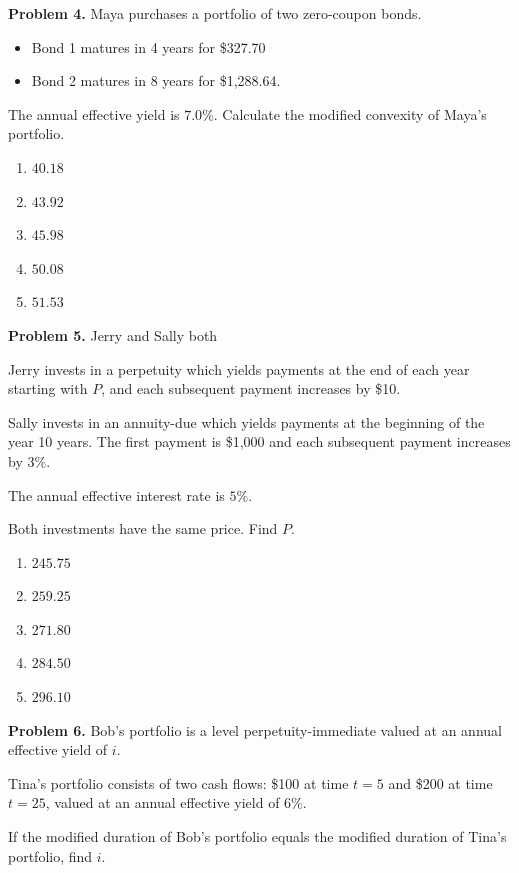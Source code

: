 \documentclass[12pt]{article}
\begin{document}
\textbf{Problem 4.} Maya purchases a portfolio of two zero-coupon bonds.

\begin{itemize}
    \item Bond 1 matures in 4 years for \$327.70
    \item Bond 2 matures in 8 years for \$1{,}288.64.
\end{itemize}

The annual effective yield is $7.0\%$. Calculate the modified convexity of Maya's portfolio.

\begin{enumerate}[label=\Alph*.]
    \item $40.18$
    \item $43.92$
    \item $45.98$
    \item $50.08$
    \item $51.53$
\end{enumerate}


\newpage


\textbf{Problem 5.} Jerry and Sally both 

Jerry invests in a perpetuity which yields payments at the end of each year starting with $P$, and each subsequent payment increases by \$10.

Sally invests in an annuity-due which yields payments at the beginning of the year 10 years. The first payment is \$1{,}000 and each subsequent payment increases by $3\%$.

The annual effective interest rate is $5\%$.

Both investments have the same price. Find $P$.

\begin{enumerate}[label=\Alph*.]
    \item $245.75$
    \item $259.25$
    \item $271.80$
    \item $284.50$
    \item $296.10$
\end{enumerate}


\newpage


\textbf{Problem 6.} Bob's portfolio is a level perpetuity-immediate valued at an annual effective yield of $i$.

 Tina's portfolio consists of two cash flows: \$100 at time $t=5$ and \$200 at time $t=25$, valued at an annual effective yield of $6\%$.


If the modified duration of Bob's portfolio equals the modified duration of Tina's portfolio, find $i$.
\end{document}

